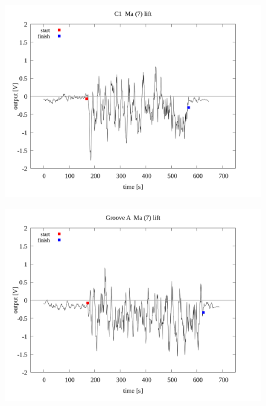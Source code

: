 \documentclass[a4paper]{jsarticle}
\begin{document}
\begin{figure}[htbp]
    \footnotesize
    \begin{center}
        \includegraphics[width=140mm]{../../../../33_result/210806/moving_average/7/lift/02/C1_ma(7)_lift_02.png}
    \end{center}
\end{figure}

\begin{figure}[htbp]
    \footnotesize
    \begin{center}
        \includegraphics[width=140mm]{../../../../33_result/210806/moving_average/7/lift/02/Groove_A_ma(7)_lift_02.png}
    \end{center}
\end{figure}
\end{document}
